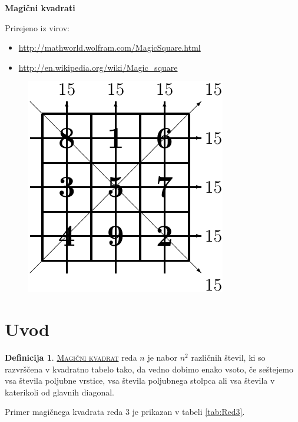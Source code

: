 \documentclass[a4paper,12pt]{article}
\newcommand{\pojem}[1]{\underline{\textsc{#1}}}
\theoremstyle{definition}
\newtheorem{definicija}{Definicija}
\theoremstyle{plain}
\begin{document}
\setlength{\belowcaptionskip}{2mm}
\setlength{\parindent}{0mm}

\begin{center}
   \LARGE{\textbf{Magični kvadrati}}
\end{center}
Prirejeno iz virov:
\begin{itemize}
   \item \url{http://mathworld.wolfram.com/MagicSquare.html}
   \item \url{http://en.wikipedia.org/wiki/Magic_square}
\end{itemize}

\begin{figure}[h]
   \centering
   \includegraphics{slika.pdf}
\end{figure}


\tableofcontents

\pagebreak
\section{Uvod}
\begin{definicija}
   \pojem{Magični kvadrat} reda $n$ je nabor $n^2$ različnih števil,
   ki so razvrščena v kvadratno tabelo tako, da vedno dobimo enako vsoto,
   če seštejemo vsa števila poljubne vrstice, vsa števila poljubnega
   stolpca ali vsa števila v katerikoli od glavnih diagonal.
\end{definicija}



Primer magičnega kvadrata reda 3 je prikazan v tabeli \ref{tab:Red3}.
\end{document}
